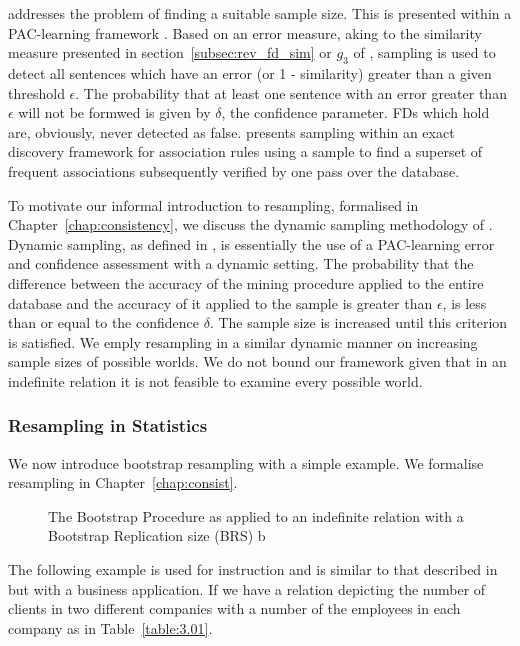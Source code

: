 \medskip

\cite{km94} addresses the problem of finding a suitable sample
size. This is presented within a PAC-learning framework
\cite{val84}. Based on an error measure, aking to the similarity
measure presented in section~\ref{subsec:rev_fd_sim} or $g_3$ of
\cite{km95}, sampling is used to detect all sentences which have an
error (or 1 - similarity) greater than a given threshold
$\epsilon$. The probability that at least one sentence with an error
greater than $\epsilon$ will not be formwed is given by $\delta$, the
confidence parameter. FDs which hold are, obviously, never detected as
false. \cite{toi96b} presents sampling within an exact discovery
framework for association rules using a sample to find a superset of
frequent associations subsequently verified by one pass over the
database.

\medskip

To motivate our informal introduction to resampling, formalised in
Chapter~\ref{chap:consistency}, we discuss the dynamic sampling
methodology of \cite{jl96}.  Dynamic sampling, as defined in
\cite{jl96}, is essentially the use of a PAC-learning error and
confidence assessment with a dynamic setting.  The probability that
the difference between the accuracy of the mining procedure applied to
the entire database and the accuracy of it applied to the sample is
greater than $\epsilon$, is less than or equal to the confidence
$\delta$. The sample size is increased until this criterion is
satisfied. We emply resampling in a similar dynamic manner on
increasing sample sizes of possible worlds.  We do not bound our
framework given that in an indefinite relation it is not feasible to
examine every possible world.

\subsubsection{Resampling in Statistics}

We now introduce bootstrap resampling with a simple example. We
formalise resampling in
Chapter~\ref{chap:consist}. 

\begin{figure}[ht]
\centerline{}
\caption{\label{rev:bootstrap} The Bootstrap Procedure as applied to an
indefinite relation with a Bootstrap Replication size (BRS) b}
\end{figure}

The following example is used for instruction and is similar
to that described in \cite{et93} but with a business 
application.
If we have a relation depicting the number of clients in 
two different companies with a number of the employees in
each company as in Table~\ref{table:3.01}.

